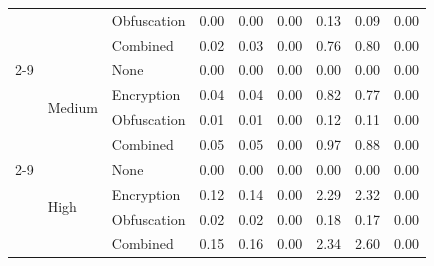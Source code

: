 \begin{table}[!t]
\begin{tabular}{lllccc ccc}
 &  & Obfuscation & 0.00 & 0.00 & \cellcolor[gray]{0.70}0.00 & 0.13 & 0.09 & \cellcolor[gray]{0.70}0.00 \\
 &  & Combined & 0.02 & 0.03 & \cellcolor[gray]{0.70}0.00 & 0.76 & 0.80 & \cellcolor[gray]{0.70}0.00 \\
\cmidrule(lr){2-9}
 & \multirow{4}{*}{Medium} & None & \cellcolor[gray]{0.70}0.00 & \cellcolor[gray]{0.70}0.00 & \cellcolor[gray]{0.70}0.00 & \cellcolor[gray]{0.70}0.00 & \cellcolor[gray]{0.70}0.00 & \cellcolor[gray]{0.70}0.00 \\
 &  & Encryption & 0.04 & 0.04 & \cellcolor[gray]{0.70}0.00 & 0.82 & 0.77 & \cellcolor[gray]{0.70}0.00 \\
 &  & Obfuscation & 0.01 & 0.01 & \cellcolor[gray]{0.70}0.00 & 0.12 & 0.11 & \cellcolor[gray]{0.70}0.00 \\
 &  & Combined & 0.05 & 0.05 & \cellcolor[gray]{0.70}0.00 & 0.97 & 0.88 & \cellcolor[gray]{0.70}0.00 \\
\cmidrule(lr){2-9}
 & \multirow{4}{*}{High} & None & \cellcolor[gray]{0.70}0.00 & \cellcolor[gray]{0.70}0.00 & \cellcolor[gray]{0.70}0.00 & \cellcolor[gray]{0.70}0.00 & \cellcolor[gray]{0.70}0.00 & \cellcolor[gray]{0.70}0.00 \\
 &  & Encryption & 0.12 & 0.14 & \cellcolor[gray]{0.70}0.00 & 2.29 & 2.32 & \cellcolor[gray]{0.70}0.00 \\
 &  & Obfuscation & 0.02 & 0.02 & \cellcolor[gray]{0.70}0.00 & 0.18 & 0.17 & \cellcolor[gray]{0.70}0.00 \\
 &  & Combined & 0.15 & 0.16 & \cellcolor[gray]{0.70}0.00 & 2.34 & 2.60 & \cellcolor[gray]{0.70}0.00 \\
\bottomrule
\end{tabular}
\end{table}
